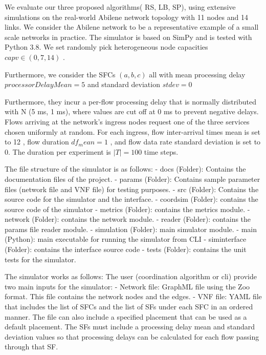 We evaluate our three proposed algorithms( RS, LB, SP),
using extensive simulations on the real-world Abilene network
topology \cite{13} with 11 nodes and 14 links. We consider the
Abilene network to be a representative example of a small scale networks in practice.
The simulator is based on SimPy and is tested with Python 3.8. We set randomly pick heterogeneous node capacities
$capv \in (0, 7, 14)$ .

Furthermore, we consider the SFCs $(a,b,c)$ all with mean processing delay $processorDelayMean = 5$ and standard deviation $stdev=0$


Furthermore, they incur a per-flow processing delay that is
normally distributed with N (5 ms, 1 ms), where values are
cut off at 0 ms to prevent negative delays. Flows arriving
at the network's ingress nodes request one of the three
services chosen uniformly at random. For each ingress,
flow inter-arrival times mean is set to 12 , flow duration $df_mean=1$ , and flow data rate standard deviation is set to 0. The duration per experiment is 
$|T| = 100$ time steps.

The file structure of the simulator is as follows\cite{14}: - docs (Folder): Contains the documentation files of the project. - params (Folder): Contains sample parameter files
 (network file and VNF file) for testing purposes. - src (Folder): Contains the source
  code for the simulator and the interface. - coordsim (Folder): contains the source code
   of the simulator - metrics (Folder): contains the metrics module. - network (Folder):
   contains the network module. - reader (Folder): contains the params file reader module.
   - simulation (Folder): main simulator module. - main (Python): main executable for running the simulator from CLI - siminterface (Folder): contains the interface source code
    - tests (Folder): contains the unit tests for the simulator.

The simulator works as follows: The user (coordination algorithm or cli) provide two main inputs for the simulator: - Network file: GraphML file using the Zoo format. This file
contains the network nodes and the edges. - VNF file: YAML file that includes the list of
SFCs and the list of SFs under each SFC in an ordered manner. The file can also include
a specified placement that can be used as a default placement. The SFs must include a
processing delay mean and standard deviation values so that processing delays can be
calculated for each flow passing through that SF.

